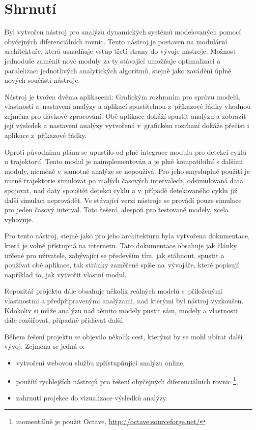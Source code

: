 \documentclass{parasim}
\begin{document}
\section{Shrnutí}

Byl vytvořen nástroj pro analýzu dynamických systémů modelovaných pomocí
obyčejných di\-fe\-renciálních rovnic. Tento nástroj je postaven na modulární architektuře,
která usnadňuje vstup třetí strany do vývoje nástroje. Možnost jednoduše zaměnit nové moduly
za ty stávající umožňuje optimalizaci a paralelizaci jednotlivých analytických algoritmů,
stejně jako zavádění úplně nových součástí nástroje.

Nástroj je tvořen dvěma aplikacemi: Grafickým rozhraním pro správu modelů, vlastností a~nastavení analýzy
a aplikací spustitelnou z~příkazové řádky vhodnou zejména pro dávkové zpracování. Obě aplikace dokáží spustit
analýzu a zobrazit její výsledek a nastavení analýzy vytvořená v~grafickém rozrhaní dokáže přečíst i aplikace
z~příkazové řádky.

Oproti původnímu plánu se upustilo od plné integrace modulu pro detekci cyklů u trajektorií. Tento modul
je naimplementován a je plně kompatibilní s dalšími moduly, nicméně v~samotné analýze se nepoužívá.
Pro jeho smysluplné použití je nutné trajektorie simulovat po malých časových intervalech,
odsimulovaná data spojovat, nad daty spouštět detekci cyklu a v~případě detekovaného cyklu
již další simulaci neprovádět. Ve stávající verzi nástroje se provádí pouze simulace pro jeden časový
interval. Toto řešení, alespoň pro testované modely, zcela vyhovuje.

Pro tento nástroj, stejně jako pro jeho architekturu byla vytvořena dokumentace, která je volně přístupná na internetu.
Tato dokumentace obsahuje jak články určené pro uživatele, zabývající se především tím, jak stáhnout, spustit a používat
obě aplikace, tak stránky zaměřené spíše na~vývojáře, které popisují například to, jak vytvořit vlastní modul.

Repozitář projektu dále obsahuje několik reálných modelů s~přiloženými vlastnostmi a před\-při\-pravenými analýzami,
nad kterými byl nástroj vyzkoušen. Kdokoliv si může analýzu nad těmito modely pustit sám, modely
a vlastnosti dále rozšiřovat, případně přidávat další.

Během řešení projektu se objevilo několik cest, kterými by se mohl ubírat další vývoj. Zejména se jedná o:

\begin{itemize}
	\item	vytvoření webovou službu zpřístupňující analýzu online,
	\item	použítí rychlejších nástrojů pro řešení obyčejných diferenciálních rovnic \footnote{momentálně je použit Octave, \url{http://octave.sourceforge.net/}},
	\item	zahrnutí projekce do vizualizace výsledků analýzy.
\end{itemize}
\end{document}
